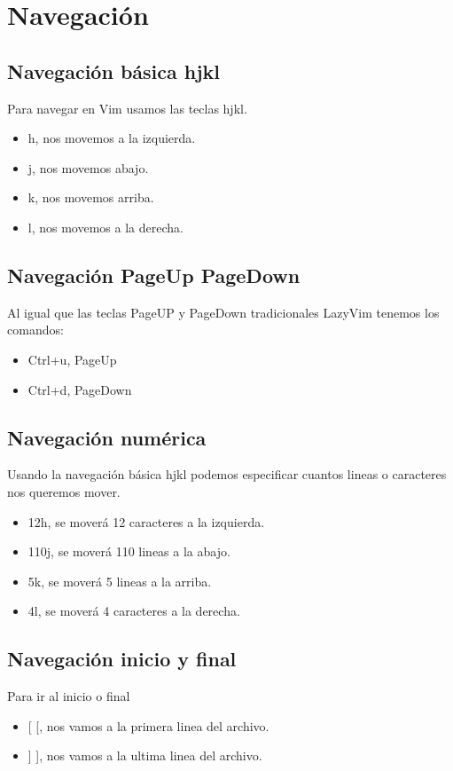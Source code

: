 \section{Navegación}
\subsection{Navegación básica hjkl}
Para navegar en Vim usamos las teclas hjkl.
\begin{itemize}
  \item h, nos movemos a la izquierda.
  \item j, nos movemos abajo.
  \item k, nos movemos arriba.
  \item l, nos movemos a la derecha.
\end{itemize}
\subsection{Navegación PageUp PageDown}
Al igual que las teclas PageUP y PageDown tradicionales LazyVim tenemos los comandos:
\begin{itemize}
  \item Ctrl+u, PageUp
  \item Ctrl+d, PageDown
\end{itemize}
\subsection{Navegación numérica}
Usando la navegación básica hjkl podemos especificar cuantos lineas o caracteres nos queremos mover.
\begin{itemize}
  \item 12h, se moverá 12 caracteres a la izquierda.
  \item 110j, se moverá 110 lineas a la abajo.
  \item 5k, se moverá 5 lineas a la arriba.
  \item 4l, se moverá 4 caracteres a la derecha.
\end{itemize}
\subsection{Navegación inicio y final}
Para ir al inicio o final
\begin{itemize}
  \item {[ [}, nos vamos a la primera linea del archivo.
  \item ] ], nos vamos a la ultima linea del archivo.
\end{itemize}
